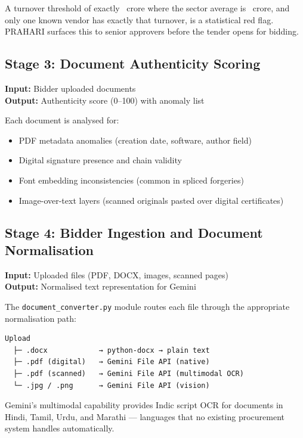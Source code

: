 \documentclass[12pt,a4paper]{article}
\begin{document}
\begin{infobox}
A turnover threshold of exactly ~crore where the sector average is
~crore, and only one known vendor has exactly that turnover, is a
statistical red flag. PRAHARI surfaces this to senior approvers before the
tender opens for bidding.
\end{infobox}

\subsection{Stage 3: Document Authenticity Scoring}

\textbf{Input:} Bidder uploaded documents \\
\textbf{Output:} Authenticity score (0--100) with anomaly list

Each document is analysed for:
\begin{itemize}
\item PDF metadata anomalies (creation date, software, author field)
\item Digital signature presence and chain validity
\item Font embedding inconsistencies (common in spliced forgeries)
\item Image-over-text layers (scanned originals pasted over digital certificates)
\end{itemize}

\subsection{Stage 4: Bidder Ingestion and Document Normalisation}

\textbf{Input:} Uploaded files (PDF, DOCX, images, scanned pages) \\
\textbf{Output:} Normalised text representation for Gemini

The \texttt{document\_converter.py} module routes each file through the appropriate
normalisation path:

\begin{verbatim}
Upload
  ├─ .docx            → python-docx → plain text
  ├─ .pdf (digital)   → Gemini File API (native)
  ├─ .pdf (scanned)   → Gemini File API (multimodal OCR)
  └─ .jpg / .png      → Gemini File API (vision)
\end{verbatim}

Gemini's multimodal capability provides Indic script OCR for documents in Hindi,
Tamil, Urdu, and Marathi --- languages that no existing procurement system
handles automatically.
\end{document}
